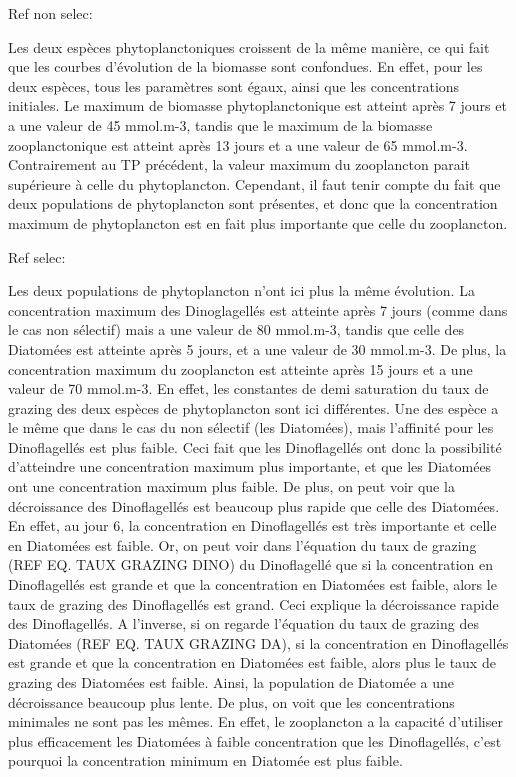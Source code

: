 Ref non selec:

Les deux espèces phytoplanctoniques croissent de la même manière, ce qui fait que les courbes d'évolution de la biomasse sont confondues. En effet, pour les deux espèces, tous les paramètres sont égaux, ainsi que les concentrations initiales. Le maximum de biomasse phytoplanctonique est atteint après 7 jours et a une valeur de 45 mmol.m-3, tandis que le maximum de la biomasse zooplanctonique est atteint après 13 jours et a une valeur de 65 mmol.m-3. Contrairement au TP précédent, la valeur maximum du zooplancton parait supérieure à celle du phytoplancton. Cependant, il faut tenir compte du fait que deux populations de phytoplancton sont présentes, et donc que la concentration maximum de phytoplancton est en fait plus importante que celle du zooplancton. 

Ref selec:

Les deux populations de phytoplancton n'ont ici plus la même évolution. La concentration maximum des Dinoglagellés est atteinte après 7 jours (comme dans le cas non sélectif) mais a une valeur de 80 mmol.m-3, tandis que celle des Diatomées est atteinte après 5 jours, et a une valeur de 30 mmol.m-3. De plus, la concentration maximum du zooplancton est atteinte après 15 jours et a une valeur de 70 mmol.m-3.
En effet, les constantes de demi saturation du taux de grazing des deux espèces de phytoplancton sont ici différentes. Une des espèce a le même que dans le cas du non sélectif (les Diatomées), mais l'affinité pour les Dinoflagellés est plus faible. Ceci fait que les Dinoflagellés ont donc la possibilité d'atteindre une concentration maximum plus importante, et que les Diatomées ont une concentration maximum plus faible. 
De plus, on peut voir que la décroissance des Dinoflagellés est beaucoup plus rapide que celle des Diatomées. En effet, au jour 6, la concentration en Dinoflagellés est très importante et celle en Diatomées est faible. Or, on peut voir dans l'équation du taux de grazing (REF EQ. TAUX GRAZING DINO) du Dinoflagellé que si la concentration en Dinoflagellés est grande et que la concentration en Diatomées est faible, alors le taux de grazing des Dinoflagellés est grand. Ceci explique la décroissance rapide des Dinoflagellés. A l'inverse, si on regarde l'équation du taux de grazing des Diatomées (REF EQ. TAUX GRAZING DA), si la concentration en Dinoflagellés est grande et que la concentration en Diatomées est faible, alors plus le taux de grazing des Diatomées est faible. Ainsi, la population de Diatomée a une décroissance beaucoup plus lente.
De plus, on voit que les concentrations minimales ne sont pas les mêmes. En effet, le zooplancton a la capacité d'utiliser plus efficacement les Diatomées à faible concentration que les Dinoflagellés, c'est pourquoi la concentration minimum en Diatomée est plus faible.

